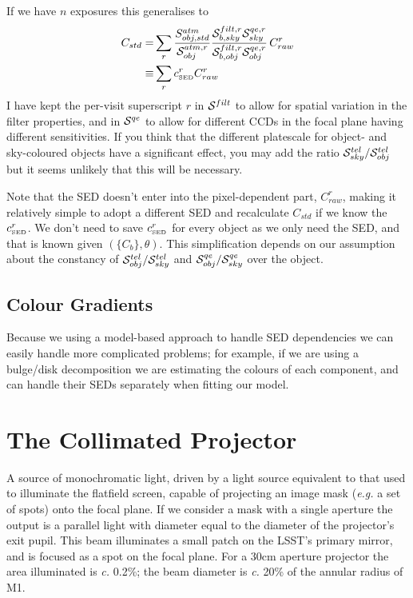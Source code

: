 \documentclass[12pt]{article}
\renewcommand{\c}{\textit{c.}\xspace}
\newcommand{\eg}{\textit{e.g.}\xspace}
\newcommand{\qe}{{\cal S}}
\begin{document}
\newcommand{\cSED}{c_{\scriptscriptstyle\rm SED}}

If we have $n$ exposures this generalises to
\begin{align*}
C_{std}  =& \sum_r
    \frac{S_{obj,std}^{atm}}{\qe_{obj}^{atm,r}}
    \frac{\qe_{b, sky}^{filt,r} \qe_{sky}^{qe,r}}
         {\qe_{b, obj}^{filt,r} \qe_{obj}^{qe,r}}
    \, C_{raw}^r\\
 \equiv& \sum_r \cSED^r C_{raw}^r
\end{align*}
I have kept the per-visit superscript $r$ in $\qe^{filt}$ to allow for spatial variation in the filter
properties, and in $\qe^{qe}$ to allow for different CCDs in the focal plane having different sensitivities.
If you think that the different platescale for object- and sky-coloured objects have a significant effect, you
may add the ratio $\qe_{sky}^{tel}/\qe_{obj}^{tel}$ but it seems unlikely that this will be necessary.

Note that the SED doesn't enter into the pixel-dependent part, $C_{raw}^r$, making it relatively simple to
adopt a different SED and recalculate $C_{std}$ if we know the $\cSED^r$.  We don't need to save $\cSED^r$
for every object as we only need the SED, and that is known given $(\{C_b\}, \theta)$.  This simplification
depends on our assumption about the constancy of  $\qe_{obj}^{tel}/\qe_{sky}^{tel}$ and
$\qe_{obj}^{qe}/\qe_{sky}^{qe}$ over the object.

\subsection{Colour Gradients}

Because we using a model-based approach to handle SED dependencies we can easily handle more complicated
problems; for example, if we are using a bulge/disk decomposition we are estimating the colours of each
component, and can handle their SEDs separately when fitting our model.

\appendix

\section{The Collimated Projector}
\label{appProjector}

A source of monochromatic light, driven by a light source equivalent to that used to illuminate the flatfield
screen, capable of projecting an image mask (\eg a set of spots) onto the focal plane.  If we consider a mask
with a single aperture the output is a parallel light with diameter equal to the diameter of the projector's
exit pupil.  This beam illuminates a small patch on the LSST's primary mirror, and is focused as a spot on the
focal plane.  For a 30cm aperture projector the area illuminated is \c 0.2\%; the beam diameter is \c 20\%
of the annular radius of M1.
\end{document}
